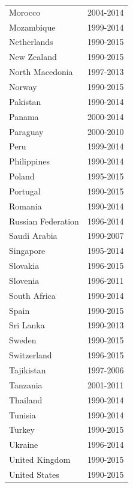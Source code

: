 \documentclass[12pt,a4paper]{article}
\begin{document}
\begin{table}[htbp]
\begin{subtable}{0.45\textwidth}
\begin{tabular}{ll}
                   Morocco &  2004-2014 \\
                Mozambique &  1999-2014 \\
               Netherlands &  1990-2015 \\
               New Zealand &  1990-2015 \\
           North Macedonia &  1997-2013 \\
                    Norway &  1990-2015 \\
                  Pakistan &  1990-2014 \\
                    Panama &  2000-2014 \\
                  Paraguay &  2000-2010 \\
                      Peru &  1999-2014 \\
               Philippines &  1990-2014 \\
                    Poland &  1995-2015 \\
                  Portugal &  1990-2015 \\
                   Romania &  1990-2014 \\
        Russian Federation &  1996-2014 \\
              Saudi Arabia &  1990-2007 \\
                 Singapore &  1995-2014 \\
                  Slovakia &  1996-2015 \\
                  Slovenia &  1996-2011 \\
              South Africa &  1990-2014 \\
                     Spain &  1990-2015 \\
                 Sri Lanka &  1990-2013 \\
                    Sweden &  1990-2015 \\
               Switzerland &  1996-2015 \\
                Tajikistan &  1997-2006 \\
                  Tanzania &  2001-2011 \\
                  Thailand &  1990-2014 \\
                   Tunisia &  1990-2014 \\
                    Turkey &  1990-2015 \\
                   Ukraine &  1996-2014 \\
            United Kingdom &  1990-2015 \\
             United States &  1990-2015 \\

\end{tabular}
\end{subtable}
\end{table}
\end{document}
